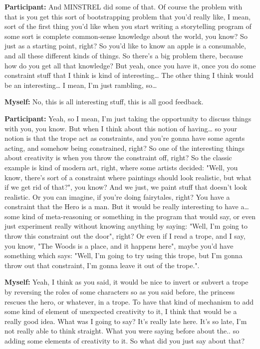 \documentclass[11pt]{report}
\begin{document}
\begin{linenumbers}
\textbf{Participant:} And MINSTREL did some of that. Of course the problem with that is you get this sort of bootstrapping problem that you'd really like, I mean, sort of the first thing you'd like when you start writing a storytelling program of some sort is complete common-sense knowledge about the world, you know? So just as a starting point, right? So you'd like to know an apple is a consumable, and all these different kinds of things. So there's a big problem there, because how do you get all that knowledge? But yeah, once you have it, once you do some constraint stuff that I think is kind of interesting\ldots{} The other thing I think would be an interesting\ldots{} I mean, I'm just rambling, so\ldots{}

\textbf{Myself:} No, this is all interesting stuff, this is all good feedback.

\textbf{Participant:} Yeah, so I mean, I'm just taking the opportunity to discuss things with you, you know. But when I think about this notion of having\ldots{} so your notion is that the trope act as constraints, and you're gonna have some agents acting, and somehow being constrained, right? So one of the interesting things about creativity is when you throw the constraint off, right? So the classic example is kind of modern art, right, where some artists decided: "Well, you know, there's sort of a constraint where paintings should look realistic, but what if we get rid of that?", you know? And we just, we paint stuff that doesn't look realistic. Or you can imagine, if you're doing fairytales, right? You have a constraint that the Hero is a man. But it would be really interesting to have a\ldots{} some kind of meta-reasoning or something in the program that would say, or even just experiment really without knowing anything by saying: "Well, I'm going to throw this constraint out the door", right? Or even if I read a trope, and I say, you know, "The Woods is a place, and it happens here", maybe you'd have something which says: "Well, I'm going to try using this trope, but I'm gonna throw out that constraint, I'm gonna leave it out of the trope.".

\textbf{Myself:} Yeah, I think as you said, it would be nice to invert or subvert a trope by reversing the roles of some characters so as you said before, the princess rescues the hero, or whatever, in a trope. To have that kind of mechanism to add some kind of element of unexpected creativity to it, I think that would be a really good idea. What was I going to say? It's really late here. It's so late, I'm not really able to think straight. What you were saying before about the.. so adding some elements of creativity to it. So what did you just say about that?


\end{linenumbers}
\end{document}
